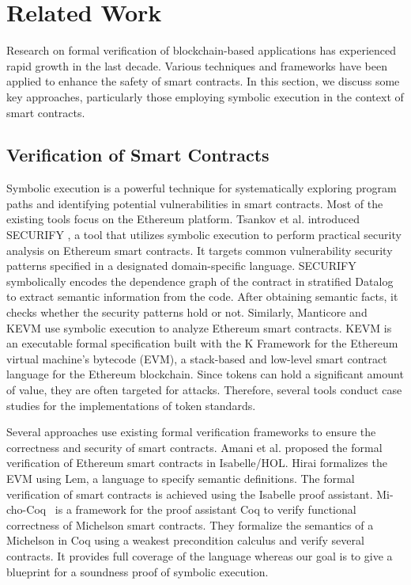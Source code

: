 \section{Related Work}
\label{sec:related-work}

Research on formal verification of blockchain-based applications
has experienced rapid growth in the last decade. Various techniques
and frameworks have been applied to enhance the safety of smart
contracts. In this section, we 
discuss some key approaches, particularly those employing symbolic
execution in the context of smart contracts. 
 
\subsection{Verification of Smart Contracts}
\label{sec:verif-smart-contr}


Symbolic execution is a powerful technique for
systematically exploring program paths and identifying potential
vulnerabilities in smart contracts. Most of the existing tools focus
on the Ethereum platform. Tsankov et al. introduced
SECURIFY \cite{securify}, a tool that utilizes symbolic execution to
perform practical security analysis on Ethereum smart contracts. It
targets common vulnerability security patterns specified in a
designated domain-specific language. SECURIFY symbolically encodes the
dependence graph of the contract in stratified Datalog to extract
semantic information from the code. After obtaining semantic facts, it
checks whether the security patterns hold or not. Similarly, Manticore
\cite{manticore} and KEVM \cite{kevm} use symbolic execution to
analyze Ethereum smart contracts. KEVM is an executable formal
specification built with the K Framework for the Ethereum virtual
machine's bytecode (EVM), a stack-based and low-level smart contract
language for the Ethereum blockchain. Since tokens can hold a
significant amount of value, they are often targeted for
attacks. Therefore, several tools \cite{kevm,park} conduct case
studies for the implementations of token standards. 

Several approaches use existing formal verification frameworks to
ensure the correctness and security of smart contracts. Amani et
al. \cite{isabelle} proposed the formal verification of Ethereum smart
contracts in Isabelle/HOL. Hirai \cite{hirai} formalizes the EVM using
Lem, a language to specify semantic definitions. The formal
verification of smart contracts is achieved using the Isabelle proof
assistant. 
Mi-cho-Coq~\cite{micho} is a framework for the proof assistant Coq to verify
functional correctness of Michelson smart contracts. They formalize
the semantics of a Michelson in Coq using a weakest precondition
calculus and verify several contracts.
It provides full coverage of the language whereas our goal is to give
a blueprint for a soundness proof of symbolic execution.

